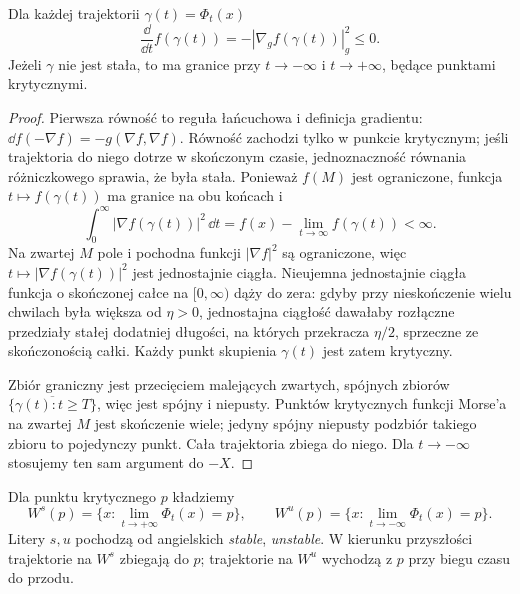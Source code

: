 \begin{stwierdzenie}
\label{prop:spadek-morse-17}
Dla każdej trajektorii $\gamma(t)=\Phi_t(x)$
\begin{equation}\label{eq:spadek-morse-17}
 \frac{\dd}{\dd t} f(\gamma(t))
 =-|\nabla_g f(\gamma(t))|_g^2\leq0.
\end{equation}
Jeżeli $\gamma$ nie jest stała, to
ma granice przy $t\to-\infty$
i $t\to+\infty$, będące
punktami krytycznymi.
\end{stwierdzenie}
\begin{proof}
Pierwsza równość to reguła łańcuchowa
i definicja gradientu:
$\dd f(-\nabla f)=-g(\nabla f,\nabla f)$.
Równość zachodzi tylko w punkcie
krytycznym; jeśli trajektoria
do niego dotrze w skończonym czasie,
jednoznaczność równania różniczkowego
sprawia, że była stała.
Ponieważ $f(M)$ jest ograniczone,
funkcja $t\mapsto f(\gamma(t))$
ma granice na obu końcach i
\[
 \int_0^\infty
       |\nabla f(\gamma(t))|^2\,\dd t
 =f(x)-\lim_{t\to\infty}f(\gamma(t))
 <\infty.
\]
Na zwartej $M$ pole i pochodna
funkcji $|\nabla f|^2$ są ograniczone,
więc $t\mapsto|\nabla f(\gamma(t))|^2$
jest jednostajnie ciągła.
Nieujemna jednostajnie ciągła
funkcja o skończonej całce na
$[0,\infty)$ dąży do zera:
gdyby przy nieskończenie wielu
chwilach była większa od $\eta>0$,
jednostajna ciągłość dawałaby
rozłączne przedziały stałej
dodatniej długości, na których
przekracza $\eta/2$, sprzeczne
ze skończonością całki.
Każdy punkt skupienia $\gamma(t)$
jest zatem krytyczny.

Zbiór graniczny jest przecięciem
malejących zwartych, spójnych
zbiorów
$\overline{\{\gamma(t):t\geq T\}}$,
więc jest spójny i niepusty.
Punktów krytycznych funkcji
Morse'a na zwartej $M$ jest
skończenie wiele; jedyny
spójny niepusty podzbiór
takiego zbioru to pojedynczy
punkt. Cała trajektoria
zbiega do niego. Dla
$t\to-\infty$ stosujemy
ten sam argument do $-X$.
\end{proof}

\begin{definicja}
\label{def:stable-morse-17}
Dla punktu krytycznego $p$ kładziemy
\[
 W^s(p)=\{x:\lim_{t\to+\infty}\Phi_t(x)=p\},
 \qquad
 W^u(p)=\{x:\lim_{t\to-\infty}\Phi_t(x)=p\}.
\]
Litery $s,u$ pochodzą od
angielskich \emph{stable}, \emph{unstable}.
W kierunku przyszłości trajektorie
na $W^s$ zbiegają do $p$;
trajektorie na $W^u$ wychodzą z $p$
przy biegu czasu do przodu.
\end{definicja}

